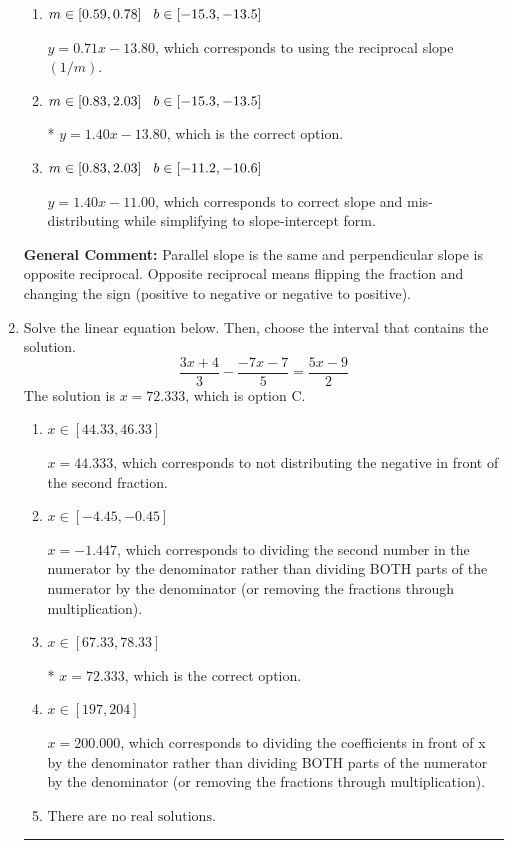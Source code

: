 \documentclass{extbook}[14pt]
\newcommand{\litem}[1]{\item #1

\rule{\textwidth}{0.4pt}}
\begin{document}
\begin{enumerate}
{\begin{enumerate}[label=\Alph*.]
 $y = -1.40x + 5.80$, which corresponds to using the negative slope.
\item \( m \in [0.59, 0.78] \hspace*{3mm} b \in [-15.3, -13.5] \)

 $y = 0.71x - 13.80$, which corresponds to using the reciprocal slope $(1/m)$.
\item \( m \in [0.83, 2.03] \hspace*{3mm} b \in [-15.3, -13.5] \)

* $y = 1.40x - 13.80$, which is the correct option.
\item \( m \in [0.83, 2.03] \hspace*{3mm} b \in [-11.2, -10.6] \)

 $y = 1.40x - 11.00$, which corresponds to correct slope and mis-distributing while simplifying to slope-intercept form.
\end{enumerate}

\textbf{General Comment:} Parallel slope is the same and perpendicular slope is opposite reciprocal. Opposite reciprocal means flipping the fraction and changing the sign (positive to negative or negative to positive).
}
\litem{
Solve the linear equation below. Then, choose the interval that contains the solution.
\[ \frac{3x + 4}{3} - \frac{-7x -7}{5} = \frac{5x -9}{2} \]The solution is \( x = 72.333 \), which is option C.\begin{enumerate}[label=\Alph*.]
\item \( x \in [44.33, 46.33] \)

 $x = 44.333$, which corresponds to not distributing the negative in front of the second fraction.
\item \( x \in [-4.45, -0.45] \)

 $x = -1.447$, which corresponds to dividing the second number in the numerator by the denominator rather than dividing BOTH parts of the numerator by the denominator (or removing the fractions through multiplication).
\item \( x \in [67.33, 78.33] \)

* $x = 72.333$, which is the correct option.
\item \( x \in [197, 204] \)

 $x = 200.000$, which corresponds to dividing the coefficients in front of x by the denominator rather than dividing BOTH parts of the numerator by the denominator (or removing the fractions through multiplication).
\item \( \text{There are no real solutions.} \)


\end{enumerate}}
\end{enumerate}
\end{document}
